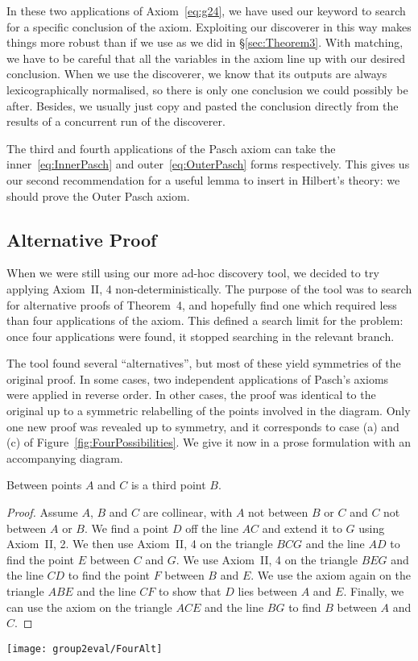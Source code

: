 In these two applications of Axiom~\ref{eq:g24}, we have used our  keyword to search for a specific conclusion of the axiom. Exploiting our discoverer in this way makes things more robust than if we use  as we did in \S\ref{sec:Theorem3}. With matching, we have to be careful that all the variables in the axiom line up with our desired conclusion. When we use the discoverer, we know that its outputs are always lexicographically normalised, so there is only one conclusion we could possibly be after. Besides, we usually just copy and pasted the conclusion directly from the results of a concurrent run of the discoverer.

The third and fourth applications of the Pasch axiom can take the inner~\eqref{eq:InnerPasch} and outer~\eqref{eq:OuterPasch} forms respectively. This gives us our second recommendation for a useful lemma to insert in Hilbert's theory: we should prove the Outer Pasch axiom.

\subsection{Alternative Proof}\label{sec:FourAlternative}
When we were still using our more ad-hoc discovery tool, we decided to try applying Axiom~II, 4 non-deterministically. The purpose of the tool was to search for alternative proofs of Theorem~4, and hopefully find one which required less than four applications of the axiom. This defined a search limit for the problem: once four applications were found, it stopped searching in the relevant branch. 

The tool found several ``alternatives'', but most of these yield symmetries of the original proof. In some cases, two independent applications of Pasch's axioms were applied in reverse order. In other cases, the proof was identical to the original up to a symmetric relabelling of the points involved in the diagram. Only one new proof was revealed up to symmetry, and it corresponds to case (a) and (c) of Figure~\ref{fig:FourPossibilities}. We give it now in a prose formulation with an accompanying diagram.

\begin{theorem}
Between points $A$ and $C$ is a third point $B$.
\end{theorem}
\begin{proof}Assume $A$, $B$ and $C$ are collinear, with $A$ not between $B$ or $C$ and $C$ not between $A$ or $B$. We find a point $D$ off the line $AC$ and extend it to $G$ using Axiom~II, 2. We then use Axiom~II, 4 on the triangle $BCG$ and the line $AD$ to find the point $E$ between $C$ and $G$. We use Axiom~II, 4 on the triangle $BEG$ and the line $CD$ to find the point $F$ between $B$ and $E$. We use the axiom again on the triangle $ABE$ and the line $CF$ to show that $D$ lies between $A$ and $E$. Finally, we can use the axiom on the triangle $ACE$ and the line $BG$ to find $B$ between $A$ and $C$.
\end{proof}
\begin{center}\texttt{[image: group2eval/FourAlt]}
\end{center}

